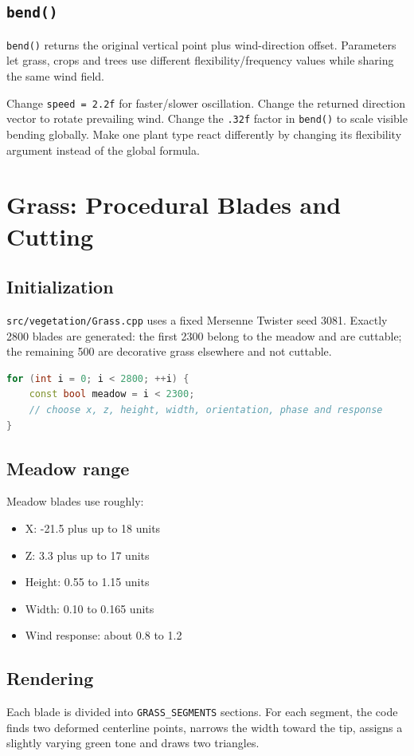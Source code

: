 \documentclass[11pt,a4paper,openany]{book}
\newcommand{\code}[1]{\texttt{#1}}
\newcommand{\file}[1]{\nolinkurl{#1}}
\begin{document}
\section{\texttt{bend()}}
\code{bend()} returns the original vertical point plus wind-direction offset. Parameters let grass, crops and trees use different flexibility/frequency values while sharing the same wind field.

\begin{editbox}
	Change \code{speed = 2.2f} for faster/slower oscillation. Change the returned direction vector to rotate prevailing wind. Change the \code{.32f} factor in \code{bend()} to scale visible bending globally. Make one plant type react differently by changing its flexibility argument instead of the global formula.
\end{editbox}

\chapter{Grass: Procedural Blades and Cutting}
\section{Initialization}
\file{src/vegetation/Grass.cpp} uses a fixed Mersenne Twister seed 3081. Exactly 2800 blades are generated: the first 2300 belong to the meadow and are cuttable; the remaining 500 are decorative grass elsewhere and not cuttable.

\begin{lstlisting}[language=C++]
for (int i = 0; i < 2800; ++i) {
    const bool meadow = i < 2300;
    // choose x, z, height, width, orientation, phase and response
}
\end{lstlisting}

\section{Meadow range}
Meadow blades use roughly:
\begin{itemize}
	\item X: -21.5 plus up to 18 units
	\item Z: 3.3 plus up to 17 units
	\item Height: 0.55 to 1.15 units
	\item Width: 0.10 to 0.165 units
	\item Wind response: about 0.8 to 1.2
\end{itemize}

\section{Rendering}
Each blade is divided into \code{GRASS_SEGMENTS} sections. For each segment, the code finds two deformed centerline points, narrows the width toward the tip, assigns a slightly varying green tone and draws two triangles.
\end{document}
